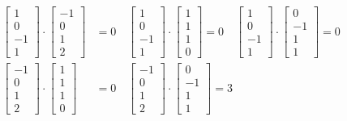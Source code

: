 \documentclass{math}
\begin{document}
\begin{align*}
  \begin{bmatrix}1 \\ 0 \\ -1 \\ 1\end{bmatrix}\cdot
    \begin{bmatrix}-1 \\ 0 \\ 1 \\ 2\end{bmatrix} &= 0 \quad
  \begin{bmatrix}1 \\ 0 \\ -1 \\ 1\end{bmatrix}\cdot
    \begin{bmatrix}1 \\ 1 \\ 1 \\ 0\end{bmatrix} = 0 \quad
  \begin{bmatrix}1 \\ 0 \\ -1 \\ 1\end{bmatrix}\cdot
    \begin{bmatrix}0 \\ -1 \\ 1 \\ 1\end{bmatrix} = 0 \quad \\
  \begin{bmatrix}-1 \\ 0 \\ 1 \\ 2\end{bmatrix}\cdot
    \begin{bmatrix}1 \\ 1 \\ 1 \\ 0\end{bmatrix} &= 0 \quad
  \begin{bmatrix}-1 \\ 0 \\ 1 \\ 2\end{bmatrix}\cdot
    \begin{bmatrix}0 \\ -1 \\ 1 \\ 1\end{bmatrix} = 3
\end{align*}
\end{document}
